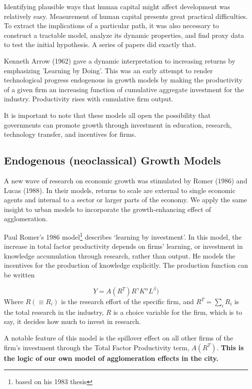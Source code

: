Identifying  plausible ways that human capital might affect development was relatively easy. Measurement of human capital presents great practical difficulties. To extract the implications of a particular path, it was also necessary to construct a tractable model, analyze its dynamic properties, and find proxy data to test the initial hypothesis.   A series of papers did exactly that.

Kenneth Arrow (1962) gave a dynamic interpretation to increasing returns by emphasizing 'Learning by Doing'. This was an early attempt to render technological progress endogenous in growth models by making the productivity of a given firm an increasing function of cumulative aggregate investment for the industry. Productivity rises with cumulative firm output.


 It is important to note that these models all open the possibility that governments can  promote growth through investment in education, research, technology transfer, and incentives for firms.

\subsection{Endogenous (neoclassical) Growth Models}
A new wave of research on economic growth was stimulated by Romer (1986) and Lucas (1988). In their models, returns to scale are external to single economic agents and internal to a sector or larger parts of the economy. We apply the same insight to urban models to incorporate the growth-enhancing effect of agglomeration. 


Paul Romer's 1986  model\footnote{ based on his 1983 thesis} describes `learning by investment'. In this model, the increase in total factor productivity depends on firms’ learning, or investment in knowledge accumulation through research, rather than output. He models the incentives for the production of knowledge explicitly. The production function  can be written

\[Y = A(R^T)R^\gamma  K^\alpha L^\beta) \]
Where $R(\equiv R_i)$ is the research effort of the specific firm, and $R^T=\sum_iR_i$ is the total research in the industry,  $R$ is a choice variable for the firm, which is to say, it decides how much to invest in research. 

A notable feature of this model is the spillover effect on all other firms of the firm's investment through the Total Factor Productivity term,  $A(R^T)$. \textbf{This is the logic of our own model of agglomeration effects in the city.}



